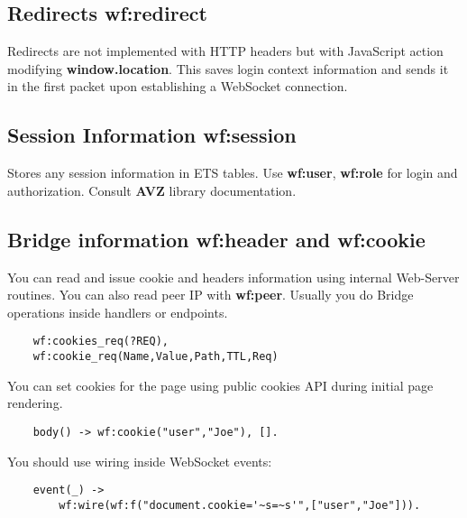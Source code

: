 \subsection{Redirects {\bf wf:redirect}}
Redirects are not implemented with HTTP headers but with JavaScript action modifying {\bf window.location}.
This saves login context information and sends it in the first packet upon establishing a WebSocket connection.

\subsection{Session Information {\bf wf:session}}
Stores any session information in ETS tables. Use {\bf wf:user}, {\bf wf:role} for
login and authorization. Consult {\bf AVZ} library documentation.

\subsection{Bridge information {\bf wf:header} and {\bf wf:cookie}}
You can read and issue cookie and headers information using internal Web-Server routines.
You can also read peer IP with {\bf wf:peer}. Usually you do Bridge operations
inside handlers or endpoints.

\begin{lstlisting}
    wf:cookies_req(?REQ),
    wf:cookie_req(Name,Value,Path,TTL,Req)
\end{lstlisting}

You can set cookies for the page using public cookies API during initial page rendering.

\begin{lstlisting}
    body() -> wf:cookie("user","Joe"), [].
\end{lstlisting}

You should use wiring inside WebSocket events:

\begin{lstlisting}
    event(_) ->
        wf:wire(wf:f("document.cookie='~s=~s'",["user","Joe"])).
\end{lstlisting}
